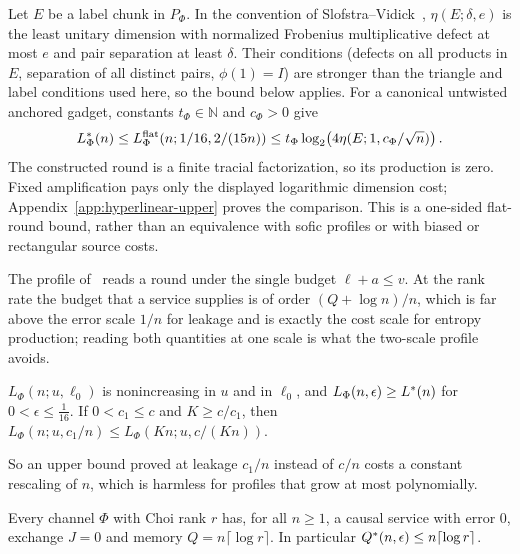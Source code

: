 \begin{remark}\label{rem:hyperlinear-upper}
Let $E$ be a label chunk in $P_\Phi$. In the convention of
Slofstra--Vidick~\cite[Definition~7.1]{SlofstraVidick2018},
$\eta(E;\delta,e)$ is the least unitary dimension with normalized
Frobenius multiplicative defect at most $e$ and pair separation at
least $\delta$. Their conditions (defects on all products in $E$,
separation of all distinct pairs, $\phi(1)=I$) are stronger than the
triangle and label conditions used here, so the bound below applies. For a canonical untwisted anchored gadget, constants
$t_\Phi\in\mathbb N$ and $c_\Phi>0$ give
\[
 L^*_\Phi(n)\leq L^{\rm flat}_\Phi(n;1/16,2/(15n))
 \leq t_\Phi\log_2\!\left(4\eta(E;1,c_\Phi/\sqrt n)\right).
\]
The constructed round is a finite tracial factorization, so its
production is zero. Fixed
amplification pays only the displayed logarithmic dimension cost;
Appendix~\ref{app:hyperlinear-upper} proves the comparison.
This is a one-sided flat-round bound, rather than an equivalence with
sofic profiles or with biased or rectangular source costs.
\end{remark}

The profile of~\cite[Remark~5.3]{DouglasMghirbiB} reads a round under the single budget $\ell+a\le v$. At the rank rate the budget that a
service supplies is of order $(Q+\log n)/n$, which is far above the error scale $1/n$ for leakage and is exactly the cost scale for entropy
production; reading both quantities at one scale is what the two-scale profile avoids.

\begin{lemma}[Monotonicity]\label{lem:monotone}
$L_\Phi(n;u,\ell_0)$ is nonincreasing in $u$ and in $\ell_0$, and $L_\Phi(n,\epsilon)\ge L^{*}(n)$ for $0<\epsilon\le\frac1{16}$. If
$0<c_1\le c$ and $K\ge c/c_1$, then $L_\Phi(n;u,c_1/n)\le L_\Phi(Kn;u,c/(Kn))$.
\end{lemma}

So an upper bound proved at leakage $c_1/n$ instead of $c/n$ costs a constant rescaling of $n$, which is harmless for profiles that grow at
most polynomially.

\begin{proposition}\label{prop:ceiling}
Every channel $\Phi$ with Choi rank $r$ has, for all $n\ge1$, a causal service with error $0$, exchange $J=0$ and memory $Q=n\lceil\log r\rceil$.
In particular $Q^{*}(n,\epsilon)\le n\lceil\log r\rceil$.
\end{proposition}

